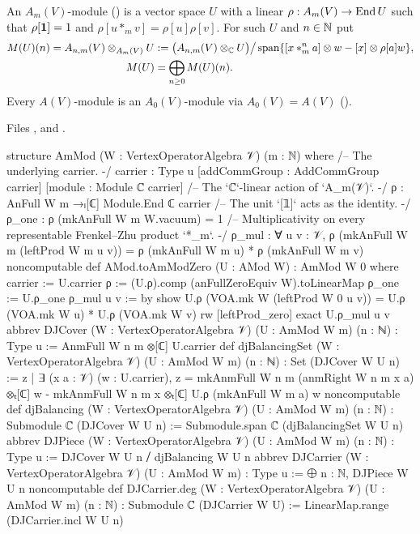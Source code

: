 \begin{definition}\label{l13:def:djcarrier}
An $A_m(V)$-module () is a vector space $U$ with a linear $\rho:A_m(V)\to\operatorname{End} U$ such that
$\rho[\mathbf{1}] = 1$ and $\rho[u*_mv] = \rho[u]\rho[v]$. For such $U$ and $n\in{\mathbb{N}}$ put
\begin{align*}
 M(U)(n) = A_{n,m}(V)\otimes_{A_m(V)}U &:= \bigl(A_{n,m}(V)\otimes_{\mathbb{C}} U\bigr)\big/
 \operatorname{span}\{[x*^n_ma]\otimes w - [x]\otimes\rho[a]w\},\\
 M(U) &= \bigoplus_{n\ge0}M(U)(n).
\end{align*}
Every $A(V)$-module is an $A_0(V)$-module via $A_0(V) = A(V)$ ().
\end{definition}
\noindent Files ,
 and
.
\begin{leancode}
structure AmMod (W : VertexOperatorAlgebra 𝒱) (m : ℕ) where
  /-- The underlying carrier. -/
  carrier : Type u
  [addCommGroup : AddCommGroup carrier]
  [module : Module ℂ carrier]
  /-- The `ℂ`-linear action of `A_m(𝒱)`. -/
  ρ : AnFull W m →ₗ[ℂ] Module.End ℂ carrier
  /-- The unit `[𝟙]` acts as the identity. -/
  ρ_one : ρ (mkAnFull W m W.vacuum) = 1
  /-- Multiplicativity on every representable Frenkel–Zhu product `*_m`. -/
  ρ_mul : ∀ u v : 𝒱,
    ρ (mkAnFull W m (leftProd W m u v)) = ρ (mkAnFull W m u) * ρ (mkAnFull W m v)
noncomputable def AMod.toAmModZero (U : AMod W) : AmMod W 0 where
  carrier := U.carrier
  ρ := (U.ρ).comp (anFullZeroEquiv W).toLinearMap
  ρ_one := U.ρ_one
  ρ_mul u v := by
    show U.ρ (VOA.mk W (leftProd W 0 u v))
      = U.ρ (VOA.mk W u) * U.ρ (VOA.mk W v)
    rw [leftProd_zero]
    exact U.ρ_mul u v
abbrev DJCover (W : VertexOperatorAlgebra 𝒱) (U : AmMod W m) (n : ℕ) : Type u :=
  AnmFull W n m ⊗[ℂ] U.carrier
def djBalancingSet (W : VertexOperatorAlgebra 𝒱) (U : AmMod W m) (n : ℕ) :
    Set (DJCover W U n) :=
  {z | ∃ (x a : 𝒱) (w : U.carrier),
    z = mkAnmFull W n m (anmRight W n m x a) ⊗ₜ[ℂ] w
        - mkAnmFull W n m x ⊗ₜ[ℂ] U.ρ (mkAnFull W m a) w}
noncomputable def djBalancing (W : VertexOperatorAlgebra 𝒱) (U : AmMod W m) (n : ℕ) :
    Submodule ℂ (DJCover W U n) :=
  Submodule.span ℂ (djBalancingSet W U n)
abbrev DJPiece (W : VertexOperatorAlgebra 𝒱) (U : AmMod W m) (n : ℕ) : Type u :=
  DJCover W U n ⧸ djBalancing W U n
abbrev DJCarrier (W : VertexOperatorAlgebra 𝒱) (U : AmMod W m) : Type u :=
  ⨁ n : ℕ, DJPiece W U n
noncomputable def DJCarrier.deg (W : VertexOperatorAlgebra 𝒱) (U : AmMod W m) (n : ℕ) :
    Submodule ℂ (DJCarrier W U) := LinearMap.range (DJCarrier.incl W U n)
\end{leancode}

